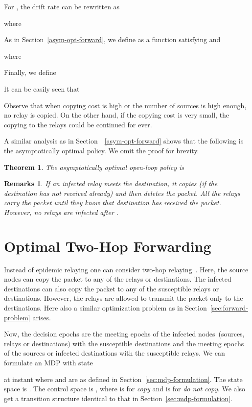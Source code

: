 \documentclass[10pt,journal,letterpaper]{IEEEtran}
\newtheorem{theorem}{Theorem}[section]
\newtheorem{remarks}{Remarks}[section]
\begin{document}
{For , the drift rate can be rewritten as

where

As in Section~\ref{asym-opt-forward}, we define  as a function satisfying  and

where

Finally, we define

It can be easily seen that

Observe that when copying cost is high or the number of sources is high enough, no relay is copied. On the other hand,
if the copying cost is very small, the copying to the relays could be continued for ever.

A similar analysis as in Section~~\ref{asym-opt-forward} shows that the following is the asymptotically
optimal policy. We omit the proof for brevity.
\begin{theorem}
\label{theorem:asym-optimal-sd}
The asymptotically optimal open-loop policy is

\end{theorem}
\begin{remarks}
If an infected relay meets the destination, it copies (if the destination has not
received already) and then deletes the packet. All the relays carry the packet
until they know that destination has received the packet. However, no relays are
infected after  .
\end{remarks}
}

\section{Optimal Two-Hop Forwarding}
\label{sec:two-hop}
Instead of epidemic relaying one can consider two-hop
relaying~\cite{comnet-wireless.grossglauser-tse02mobility-adhoc-networks}.
Here, the  source nodes can copy the packet
to any of the  relays or  destinations.
The infected destinations can also copy the packet to
any of the susceptible relays or destinations.
However, the relays are allowed to transmit the packet only
to the destinations. Here also a similar optimization problem as in
Section~\ref{sec:forward-problem} arises.


Now, the decision epochs  are the meeting epochs of the infected nodes~(sources, relays or destinations)
with the susceptible destinations and the meeting epochs of the sources or infected destinations with the susceptible relays.
We can formulate an MDP with state

at instant  where  and   are as defined in
Section~\ref{sec:mdp-formulation}. The state space is . The control space is
, where  is for {\it copy} and  is for {\it do not copy}.
We also get a transition structure identical  to that in Section~\ref{sec:mdp-formulation}.
\end{document}

